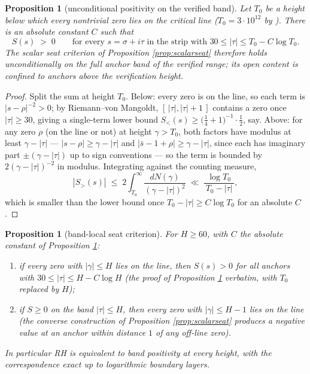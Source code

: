 \documentclass[11pt]{article}
\theoremstyle{plain}
\newtheorem{proposition}[theorem]{Proposition}
\theoremstyle{definition}
\theoremstyle{remark}
\begin{document}
\begin{proposition}[unconditional positivity on the verified band]\label{prop:verifiedband}
Let $T_0$ be a height below which every nontrivial zero lies on the critical line
($T_0=3\cdot10^{12}$ by \cite{PlattTrudgian2021}). There is an absolute constant $C$
such that
\[
  S(s)\;>\;0
  \qquad\text{for every }s=\sigma+i\tau\text{ in the strip with }
  30\le|\tau|\le T_0-C\log T_0 .
\]
The scalar seat criterion of Proposition \ref{prop:scalarseat} therefore holds
unconditionally on the full anchor band of the verified range; its open content is
confined to anchors above the verification height.
\end{proposition}

\begin{proof}
Split the sum at height $T_0$. Below: every zero is on the line, so each term is
$|s-\rho|^{-2}>0$; by Riemann--von Mangoldt, $[\,|\tau|,|\tau|+1\,]$ contains a zero
once $|\tau|\ge30$, giving a single-term lower bound
$S_{<}(s)\ge\bigl(\tfrac14+1\bigr)^{-1}\cdot\tfrac12$, say. Above: for any zero
$\rho$ (on the line or not) at height $\gamma>T_0$, both factors have modulus at
least $\gamma-|\tau|$ --- $|s-\rho|\ge\gamma-|\tau|$ and
$|\bar s-1+\rho|\ge\gamma-|\tau|$, since each has imaginary part $\pm(\gamma-|\tau|)$
up to sign conventions --- so the term is bounded by $2(\gamma-|\tau|)^{-2}$ in
modulus. Integrating against the counting measure,
\[
  |S_{>}(s)|\;\le\;2\int_{T_0}^{\infty}\frac{dN(\gamma)}{(\gamma-|\tau|)^{2}}
  \;\ll\;\frac{\log T_0}{\,T_0-|\tau|\,},
\]
which is smaller than the lower bound once $T_0-|\tau|\ge C\log T_0$ for an absolute
$C$.
\end{proof}

\begin{proposition}[band-local seat criterion]\label{prop:bandlocal}
For $H\ge60$, with $C$ the absolute constant of Proposition \ref{prop:verifiedband}:
\begin{enumerate}
\item[(i)] if every zero with $|\gamma|\le H$ lies on the line, then $S(s)>0$ for all
anchors with $30\le|\tau|\le H-C\log H$ (the proof of Proposition
\ref{prop:verifiedband} verbatim, with $T_0$ replaced by $H$);
\item[(ii)] if $S\ge0$ on the band $|\tau|\le H$, then every zero with
$|\gamma|\le H-1$ lies on the line (the converse construction of Proposition
\ref{prop:scalarseat} produces a negative value at an anchor within distance $1$ of
any off-line zero).
\end{enumerate}
In particular RH is equivalent to band positivity at every height, with the
correspondence exact up to logarithmic boundary layers.
\end{proposition}
\end{document}
